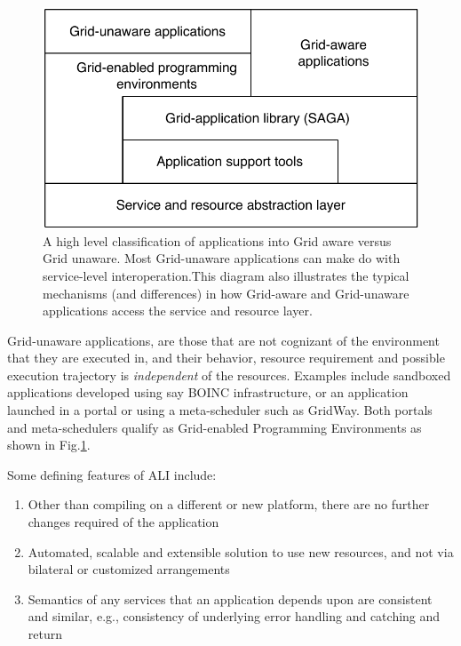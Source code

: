 \documentclass[conference,final]{IEEEtran}
\newcommand{\upup}{\vspace*{-1em}}
\begin{document}
\begin{figure}
\begin{center}
\includegraphics[scale=0.6]{../diagrams/application_scope}
\end{center}
\caption{A high level classification of applications into Grid aware
  versus Grid unaware. Most Grid-unaware applications can make do with
  service-level interoperation.This diagram also illustrates the
  typical mechanisms (and differences) in how Grid-aware and
  Grid-unaware applications access the service and resource layer. \upup}
\label{fig:scope}
\end{figure}

Grid-unaware applications, are those that are not cognizant of the
environment that they are executed in, and their behavior, resource
requirement and possible execution trajectory is {\it independent} of
the resources.  Examples include sandboxed applications developed
using say BOINC infrastructure, or an application launched in a portal
or using a meta-scheduler such as GridWay.
Both portals and meta-schedulers qualify as Grid-enabled Programming
Environments as shown in Fig.\ref{fig:scope}.

\noindent Some defining features of ALI include:
\begin{enumerate}
\item Other than compiling on a different or new platform, there are no
  further changes required of the application
\item Automated, scalable and extensible solution to use new resources,
  and not via  bilateral or customized arrangements
\item Semantics of any services that an application depends upon are
  consistent and similar, e.g., consistency of underlying error
  handling and catching and return
\end{enumerate}
\end{document}
